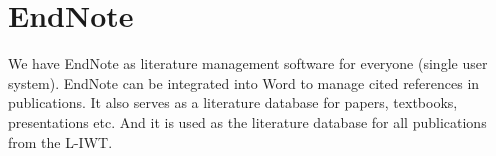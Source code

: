 \section{EndNote}

We have EndNote as literature management software for everyone (single user
system). EndNote can be integrated into Word to manage cited references in
publications. It also serves as a literature database for papers, textbooks,
presentations etc. And it is used as the literature database for all
publications from the L-IWT.
